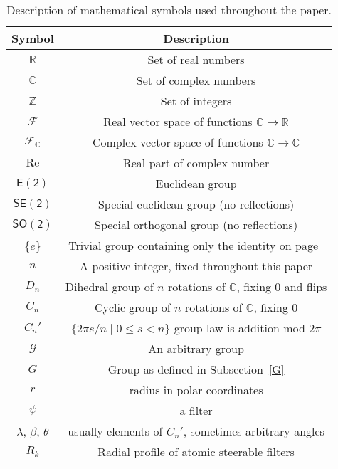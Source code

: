 \documentclass[journal]{IEEEtran}
\newcommand\Euc{\mathsf{E(2)}}
\newcommand\SEuc{\mathsf{SE(2)}}
\newcommand\SOrth{\mathsf{SO(2)}}
\newcommand\reals{\mathbb{R}}
\newcommand\complexes{\mathbb{C}}
\newcommand\integers{\mathbb{Z}}
\newcommand\F{\mathcal{F}}
\renewcommand\Re{\mathrm{Re}}
\begin{document}
{		\begin{table}[h]
	\begin{center}
		\caption{Description of mathematical symbols used throughout the paper.}
		\label{dup1 table:comparative_rotmnist}
		\setlength{\tabcolsep}{3pt} \renewcommand{\arraystretch}{1.0} \begin{tabular}{c|c}
			 \textbf{Symbol} & \textbf{Description}   \\
			\midrule
            $\reals$ &  Set of real numbers \\
            $\complexes$ &  Set of complex numbers \\
            $\integers$ &  Set of integers \\ 
            $\F$ &  Real vector space of functions $\complexes\to\reals$ \\
            $\F_\complexes$ &  Complex vector space of functions
            $\complexes\to\complexes$ \\
            $\Re$ &  Real part of complex number \\
            $\Euc$ &  Euclidean group \\
            $\SEuc$ &  Special euclidean group (no reflections) \\
            $\SOrth$ &  Special orthogonal group (no reflections) \\
            \{$e$\} &   Trivial group containing only the identity on page~\pageref{Cn} \\
            $n$ & A positive integer, fixed throughout this paper\\
            $D_n$ & Dihedral group of $n$ rotations of $\complexes$, fixing 0 and flips\\
            $C_n$ & Cyclic group of $n$ rotations of $\complexes$, fixing 0\\
            $C_n'$ & $\{2\pi s/n\mid 0\le s < n\}$ group law is addition mod $2\pi$ \\
            $\mathcal{G}$ &  An arbitrary group \\
            $G$ &  Group as defined in Subsection~\ref{G}  \\
            $r$ &  radius in polar coordinates \\
            $\psi$ &  a filter \\
            $\lambda$, $\beta$, $\theta$ & usually elements of $C_n'$, sometimes arbitrary angles\\
            $R_k$ & Radial profile of atomic steerable filters \\
			\bottomrule
		\end{tabular}
	\end{center}
	\end{table}	
}


\end{document}

